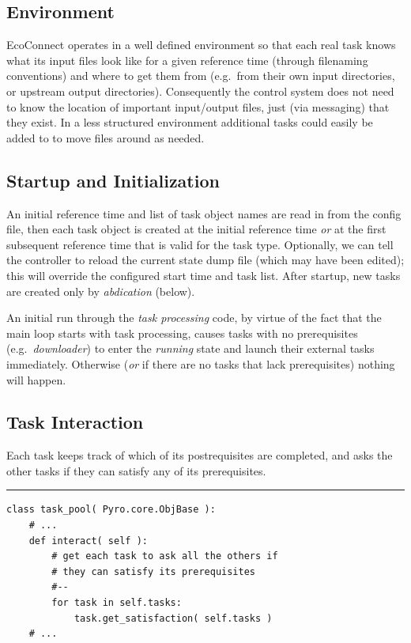 \documentclass[11pt,a4paper]{article}
\begin{document}
\subsection{Environment}

EcoConnect operates in a well defined environment so that each real task
knows what its input files look like for a given reference time
(through filenaming conventions) and where to get them from (e.g.\ from
their own input directories, or upstream output directories).
Consequently the control system does not need to know the location of
important input/output files, just (via messaging) that they exist. In a
less structured environment additional tasks could easily be added to
to move files around as needed. 

\subsection{Startup and Initialization}

An initial reference time and list of task object names are read in from
the config file, then each task object is created at the initial
reference time {\em or} at the first subsequent reference time that is
valid for the task type. Optionally, we can tell the controller to
reload the current state dump file (which may have been edited); this
will override the configured start time and task list. After startup,
new tasks are created only by {\em abdication} (below).

An initial run through the {\em task processing} code, by virtue of the
fact that the main loop starts with task processing, causes tasks with
no prerequisites (e.g.\ {\em downloader}) to enter the {\em running}
state and launch their external tasks immediately. Otherwise ({\em or}
if there are no tasks that lack prerequisites) nothing will happen.


\subsection{Task Interaction} 

Each task keeps track of which of its postrequisites are completed, and
asks the other tasks if they can satisfy any of its prerequisites. 

{\small
\noindent
\rule{5cm}{.2mm}
\begin{lstlisting}
class task_pool( Pyro.core.ObjBase ):
    # ...
    def interact( self ):
        # get each task to ask all the others if 
        # they can satisfy its prerequisites
        #--
        for task in self.tasks:
            task.get_satisfaction( self.tasks )
    # ...
\end{lstlisting}
}
\end{document}
